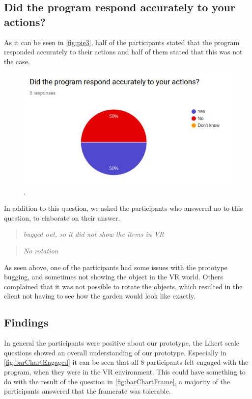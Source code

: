 \subsection*{Did the program respond accurately to your actions?}
As it can be seen in \autoref{fig:pie3}, half of the participants stated that the program responded accurately to their actions and half of them stated that this was not the case.

\begin{figure}[H]
	\centering
	\includegraphics[width=0.9\linewidth]{figure/Evaluation/pie3.png}
	\caption{.}
	\label{fig:pie3}
\end{figure}

In addition to this question, we asked the participants who answered no to this question, to elaborate on their answer.\\

\begin{quote}
	\textit{bugged out, so it did not show the items in VR}\\
\end{quote}

\begin{quote}
	\textit{No rotation}\\
\end{quote}

As seen above, one of the participants had some issues with the prototype bugging, and sometimes not showing the object in the VR world. Others complained that it was not possible to rotate the objects, which resulted in the client not having to see how the garden would look like exactly.


\subsection{Findings}
In general the participants were positive about our prototype, the Likert scale questions showed an overall understanding of our prototype.
Especially in \autoref{fig:barChartEngaged} it can be seen that all 8 participants felt engaged with the program, when they were in the VR environment. This could have something to do with the result of the question in \autoref{fig:barChartFrame}, a majority of the participants answered that the framerate was tolerable.\\


